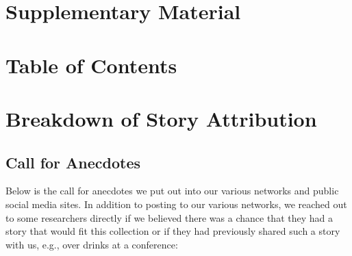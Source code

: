 \section*{\LARGE Supplementary Material}

\vspace*{20pt}
\section*{Table of Contents}
\vspace*{-5pt}
\startcontents[sections]

\newpage

\section{Breakdown of Story Attribution}
\label{appx:breakdown}

\subsection{Call for Anecdotes}

Below is the call for anecdotes we put out into our various networks and public social media sites. In addition to posting to our various networks, we reached out to some researchers directly if we believed there was a chance that they had a story that would fit this collection or if they had previously shared such a story with us, e.g., over drinks at a conference:

